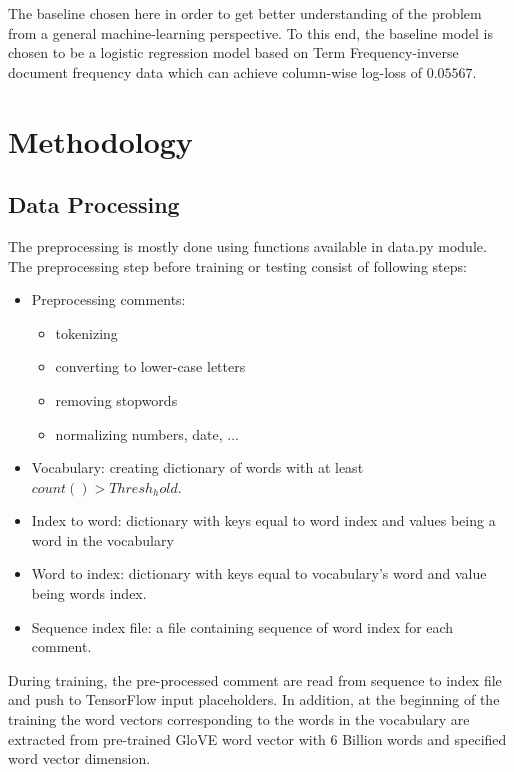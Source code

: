 \documentclass{article}
\begin{document}
    The baseline chosen here in order to get better understanding of the problem from a general machine-learning perspective. To this end, the baseline model is chosen to be a logistic regression model based on Term Frequency-inverse document frequency data which can achieve column-wise log-loss of $0.05567$.



\section{Methodology}

    \subsection{Data Processing}

    The preprocessing is mostly done using functions available in data.py module. The preprocessing step  before training or testing consist of following steps:

    \begin{itemize}
        \item Preprocessing comments:
            \begin{itemize}
                \item tokenizing
                \item converting to lower-case letters
                \item removing stopwords
                \item normalizing numbers, date, ...
            \end{itemize}

        \item Vocabulary: creating dictionary of words with at least $count() > Thresh_hold$.
        \item Index to word: dictionary with keys equal to word index and values being a word in the vocabulary
        \item Word to index: dictionary with keys equal to vocabulary's word and value being words index.
        \item Sequence index file: a file containing sequence of word index for each comment.
    \end{itemize}

    During training, the pre-processed comment are read from sequence to index file and push to TensorFlow input placeholders. In addition, at the beginning of the training the word vectors corresponding to the words in the vocabulary are extracted from pre-trained GloVE word vector with $6$ Billion words and specified word vector dimension.
\end{document}
